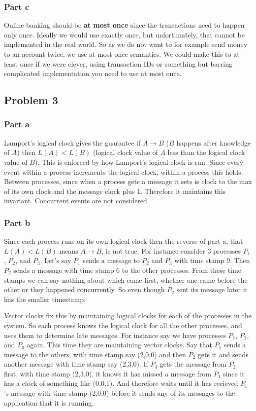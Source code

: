 \documentclass[english]{article}
\begin{document}
\subsubsection*{Part c}
Online banking should be \textbf{at most once} since the transactions need to
happen only once. Ideally we would use exactly once, but unfortunately, that
cannot be implemented in the real world. So as we do not want to for example
send money to an account twice, we use at most once semantics. We could make
this to at least once if we were clever, using transaction IDs or something
but barring complicated implementation you need to use at most once.

\subsection*{Problem 3}
\subsubsection*{Part a}
Lamport's logical clock gives the guarantee if $A \rightarrow B$
($B$ happens after knowledge of $A$)
then $L(A) < L(B)$ (logical clock value of $A$ less than the
logical clock value of $B$). This is enforced by how Lamport's logical clock
is run. Since every event within a process increments the logical clock,
within a process this holds. Between processes, since when a process gets a
message it sets is clock to the max of its own clock and the message clock
plus 1. Therefore it maintains this invariant. Concurrent events are not
considered.

\subsubsection*{Part b}
Since each process runs on its own logical clock then the reverse of part a,
that $L(A) < L(B)$ means $A \rightarrow B$, is not true. For instance consider
3 processes $P_1$, $P_2$, and $P_3$. Let's say $P_1$ sends a message to $P_2$
and $P_3$ with time stamp 9. Then $P_2$ sends a message with time stamp 6 to
the other processes. From these time stamps we can say nothing about which
came first, whether one came before the other or they happened concurrently.
So even though $P_2$ sent its message later it has the smaller timestamp.

Vector clocks fix this by maintaining logical clocks for each of the
processes in the system. So each process knows the logical clock for
all the other processes, and uses them to determine late messages. For instance
say we have processes $P_1$, $P_2$, and $P_3$ again. This time they are 
maintaining vector clocks. Say that $P_1$ sends a message to the others, 
with time stamp say (2,0,0) and then $P_2$ gets it and sends another message
with time stamp say (2,3,0). If $P_3$ gets the message from $P_2$ first,
with time stamp (2,3,0), it knows it has missed a message from $P_1$
since it has a clock of something like (0,0,1). And therefore waits until
it has recieved $P_1$'s message with time stamp (2,0,0) before it sends
any of its messages to the application that it is running.
\end{document}
